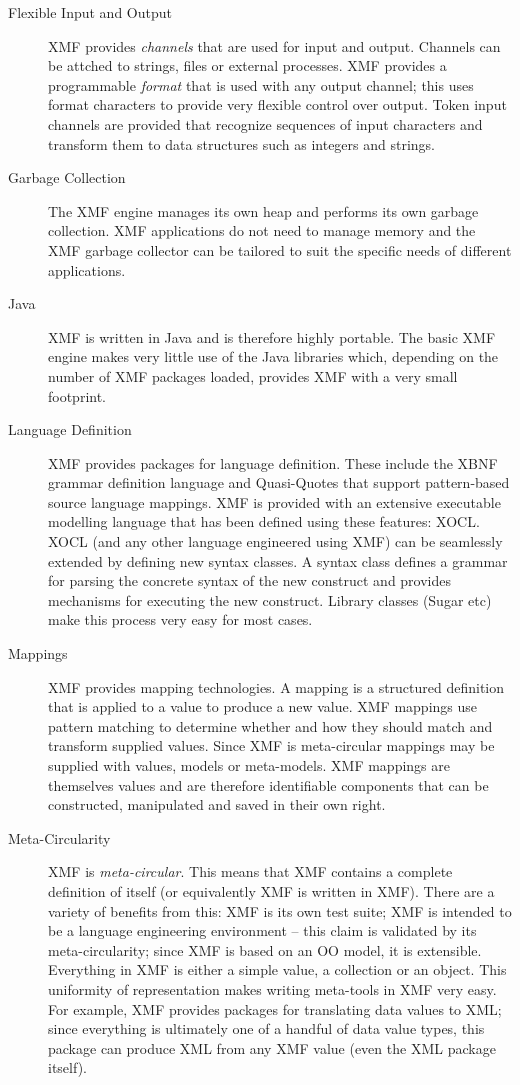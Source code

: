 \documentclass{article}
\begin{document}
\begin{description}
\item[Flexible Input and Output]
XMF provides {\em channels} that are used for input and output. Channels can be
attched to strings, files or external processes. XMF provides a programmable
{\em format} that is used with any output channel; this uses format characters
to provide very flexible control over output. Token input channels are provided
that recognize sequences of input characters and transform them to data
structures such as integers and strings.

\item[Garbage Collection]
The XMF engine manages its own heap and performs its own garbage collection.
XMF applications do not need to manage memory and the XMF garbage collector
can be tailored to suit the specific needs of different applications.

\item[Java]
XMF is written in Java and is therefore highly portable. The basic XMF engine makes 
very little use of the Java libraries which, depending on the number of XMF
packages loaded, provides XMF with a very small footprint.

\item[Language Definition]
XMF provides packages for language definition. These include the XBNF grammar
definition language and Quasi-Quotes that support pattern-based source language
mappings. XMF is provided with an extensive executable modelling language that 
has been defined using these features: XOCL. XOCL (and any other language 
engineered using XMF) can be seamlessly extended by defining new syntax
classes. A syntax class defines a grammar for parsing the concrete syntax of the
new construct and provides mechanisms for executing the new construct. Library
classes (Sugar etc) make this process very easy for most cases.

\item[Mappings]
XMF provides mapping technologies. A mapping is a structured definition that is applied
to a value to produce a new value. XMF mappings use pattern matching to determine
whether and how they should match and transform supplied values. Since XMF is meta-circular
mappings may be supplied with values, models or meta-models. XMF mappings are themselves
values and are therefore identifiable components that can be constructed, manipulated 
and saved in their own right. 

\item[Meta-Circularity]
XMF is {\em meta-circular}. This means that XMF contains a complete definition 
of itself (or equivalently XMF is written in XMF). There are a variety of benefits
from this: XMF is its own test suite; XMF is intended to be a language engineering
environment -- this claim is validated by its meta-circularity; since XMF is
based on an OO model, it is extensible. Everything in XMF is either a simple
value, a collection or an object. This uniformity of representation makes writing
meta-tools in XMF very easy. For example, XMF provides packages for translating 
data values to XML; since everything is ultimately one of a handful of data value types,
this package can produce XML from any XMF value (even the XML package itself).


\end{description}
\end{document}
